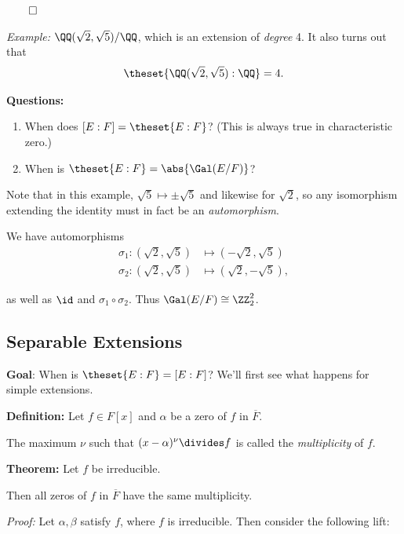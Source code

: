 \(\qed\)

\emph{Example:} \(\QQ(\sqrt 2, \sqrt 5)/\QQ\), which is an extension of
\emph{degree} 4. It also turns out that
\begin{align*}
\theset{\QQ(\sqrt 2, \sqrt 5) : \QQ} = 4.
\end{align*}

\textbf{Questions:}

\begin{enumerate}
\def\labelenumi{\arabic{enumi}.}
\item
  When does \([E: F] = \theset{E: F}\)? (This is always true in
  characteristic zero.)
\item
  When is \(\theset{E: F} = \abs{\Gal(E/F)}\)?
\end{enumerate}

Note that in this example, \(\sqrt 5 \mapsto \pm \sqrt 5\) and likewise
for \(\sqrt 2\), so any isomorphism extending the identity must in fact
be an \emph{automorphism}.

We have automorphisms \begin{align*}
\sigma_1: (\sqrt 2, \sqrt 5) &\mapsto (-\sqrt 2,\sqrt 5) \\
\sigma_2: (\sqrt 2, \sqrt 5) &\mapsto (\sqrt 2, -\sqrt 5)
,\end{align*}

as well as \(\id\) and \(\sigma_1 \circ \sigma_2\). Thus
\(\Gal(E/F) \cong \ZZ_2^2\).

\hypertarget{separable-extensions}{%
\subsection{Separable Extensions}\label{separable-extensions}}

\textbf{Goal}: When is \(\theset{E: F} = [E: F]\)? We'll first see what
happens for simple extensions.

\textbf{Definition:} Let \(f \in F[x]\) and \(\alpha\) be a zero of
\(f\) in \(\overline F\).

The maximum \(\nu\) such that \((x-\alpha)^\nu \divides f\) is called
the \emph{multiplicity} of \(f\).

\textbf{Theorem:} Let \(f\) be irreducible.

Then all zeros of \(f\) in \(\overline F\) have the same multiplicity.

\emph{Proof:} Let \(\alpha, \beta\) satisfy \(f\), where \(f\) is
irreducible. Then consider the following lift:

\begin{center}
\end{center}

